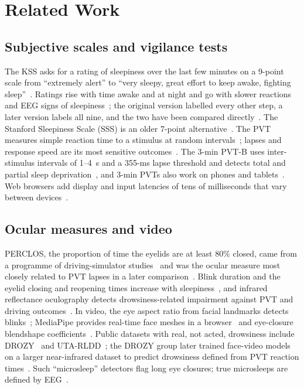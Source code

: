 \section{Related Work}
\label{sec:related}

\subsection{Subjective scales and vigilance tests}
The KSS asks for a rating of sleepiness over the last few minutes on a 9-point scale from ``extremely alert'' to ``very sleepy, great effort to keep awake, fighting sleep''~\cite{akerstedt1990subjective}. Ratings rise with time awake and at night and go with slower reactions and EEG signs of sleepiness~\cite{kaida2006validation,akerstedt2014subjective}; the original version labelled every other step, a later version labels all nine, and the two have been compared directly~\cite{miley2016comparing}. The Stanford Sleepiness Scale (SSS) is an older 7-point alternative~\cite{hoddes1973quantification}. The PVT measures simple reaction time to a stimulus at random intervals~\cite{dinges1985microcomputer}; lapses and response speed are its most sensitive outcomes~\cite{basner2011maximizing}. The 3-min PVT-B uses inter-stimulus intervals of 1--4~s and a 355-ms lapse threshold and detects total and partial sleep deprivation~\cite{basner2011validity}, and 3-min PVTs also work on phones and tablets~\cite{grant2017three}. Web browsers add display and input latencies of tens of milliseconds that vary between devices~\cite{anwylirvine2021realistic,bridges2020timing}.

\subsection{Ocular measures and video}
PERCLOS, the proportion of time the eyelids are at least 80\% closed, came from a programme of driving-simulator studies~\cite{wierwille1994research} and was the ocular measure most closely related to PVT lapses in a later comparison~\cite{dinges1998evaluation,dinges1998perclos}. Blink duration and the eyelid closing and reopening times increase with sleepiness~\cite{caffier2003experimental,schleicher2008blinks}, and infrared reflectance oculography detects drowsiness-related impairment against PVT and driving outcomes~\cite{wilkinson2013accuracy,anderson2013assessment}. In video, the eye aspect ratio from facial landmarks detects blinks~\cite{soukupova2016real}; MediaPipe provides real-time face meshes in a browser~\cite{kartynnik2019real,lugaresi2019mediapipe} and eye-closure blendshape coefficients~\cite{grishchenko2023blendshapes}. Public datasets with real, not acted, drowsiness include DROZY~\cite{massoz2016ulg} and UTA-RLDD~\cite{ghoddoosian2019realistic}; the DROZY group later trained face-video models on a larger near-infrared dataset to predict drowsiness defined from PVT reaction times~\cite{massoz2018multi}. Such ``microsleep'' detectors flag long eye closures; true microsleeps are defined by EEG~\cite{hertig2020microsleep}.

